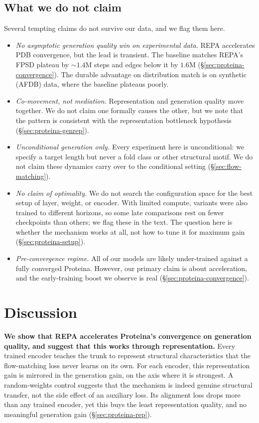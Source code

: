 \documentclass[12pt,a4paper,twoside]{report}
\begin{document}
\subsection{What we do not claim}
\label{sec:proteina-scope}

Several tempting claims do not survive our data, and we flag them here.

\begin{itemize}
  \item \emph{No asymptotic generation quality win on experimental data.} REPA accelerates PDB convergence, but the lead is transient. The baseline matches REPA's FPSD plateau by ${\sim}1.4$M steps and edges below it by $1.6$M (\S\ref{sec:proteina-convergence}). The durable advantage on distribution match is on synthetic (AFDB) data, where the baseline plateaus poorly.
  \item \emph{Co-movement, not mediation.} Representation and generation quality move together. We do not claim one formally causes the other, but we note that the pattern is consistent with the representation bottleneck hypothesis (\S\ref{sec:proteina-genrep}).
  \item \emph{Unconditional generation only.} Every experiment here is unconditional: we specify a target length but never a fold class or other structural motif. We do not claim these dynamics carry over to the conditional setting (\S\ref{sec:flow-matching}).
  \item \emph{No claim of optimality.} We do not search the configuration space for the best setup of layer, weight, or encoder. With limited compute, variants were also trained to different horizons, so some late comparisons rest on fewer checkpoints than others; we flag these in the text. The question here is whether the mechanism works at all, not how to tune it for maximum gain (\S\ref{sec:proteina-setup}).
  \item \emph{Pre-convergence regime.} All of our models are likely under-trained against a fully converged Proteina. However, our primary claim is about acceleration, and the early-training boost we observe is real (\S\ref{sec:proteina-convergence}).
\end{itemize}

\section{Discussion}
\label{sec:proteina-discussion}

\textbf{We show that REPA accelerates Proteina's convergence on generation quality, and suggest that this works through representation.} Every trained encoder teaches the trunk to represent structural characteristics that the flow-matching loss never learns on its own. For each encoder, this representation gain is mirrored in the generation gain, on the axis where it is strongest. A random-weights control suggests that the mechanism is indeed genuine structural transfer, not the side effect of an auxiliary loss. Its alignment loss drops more than any trained encoder, yet this buys the least representation quality, and no meaningful generation gain (\S\ref{sec:proteina-rep}).
\end{document}
